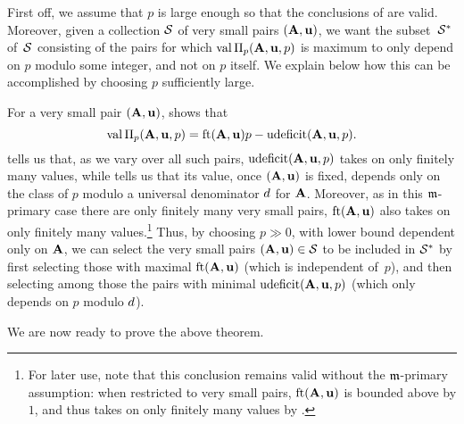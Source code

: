 \documentclass{amsart}
\begin{document}
\begin{remark}
   \label{p large m-primary: R} 
   First off, we assume that $p$ is large enough so that the conclusions of  are valid.
   Moreover, given a collection $\S$ of very small pairs $(\matA,\vv{u})$, we want the subset~$\S^*$ of~$\S$ consisting of the pairs for which $\val \IP_p(\matA,\vv{u},p)$ is maximum to only depend on $p$ modulo some integer, and not on $p$ itself.
   We explain below how this can be accomplished by choosing $p$ sufficiently large.

   For a very small pair $(\matA,\vv{u})$,  shows that
   \[ \val \IP_p(\matA,\vv{u},p) = \ft{\matA}{\vv{u}}p-\udeficit(\matA,\vv{u},p).\]
    tells us that, as we vary over all such pairs, $\udeficit(\matA,\vv{u},p)$ takes on only finitely many values, while  tells us that its value, once $(\matA,\vv{u})$ is fixed, depends only on the class of $p$ modulo a universal denominator $\denom$ for $\matA$.
   Moreover, as in this $\idealm$-primary case there are only finitely many very small pairs, $\ft{\matA}{\vv{u}}$ also takes on only finitely many values.\footnote{For later use, note that this conclusion remains valid without the $\idealm$-primary assumption: when restricted to very small pairs, $\ft{\matA}{\vv{u}}$ is bounded above by $1$, and thus takes on only finitely many values by .}
   Thus, by choosing $p\gg 0$, with lower bound dependent only on $\matA$, we can select the very small pairs $(\matA,\vv{u}) \in \S$ to be included in $\S^*$ by first selecting those with maximal $\ft{\matA}{\vv{u}}$ (which is independent of~$p$), and then selecting among those the pairs with minimal $\udeficit(\matA,\vv{u},p)$ (which only depends on $p$ modulo $\denom$).
\end{remark}

We are now ready to prove the above theorem.
\end{document}
